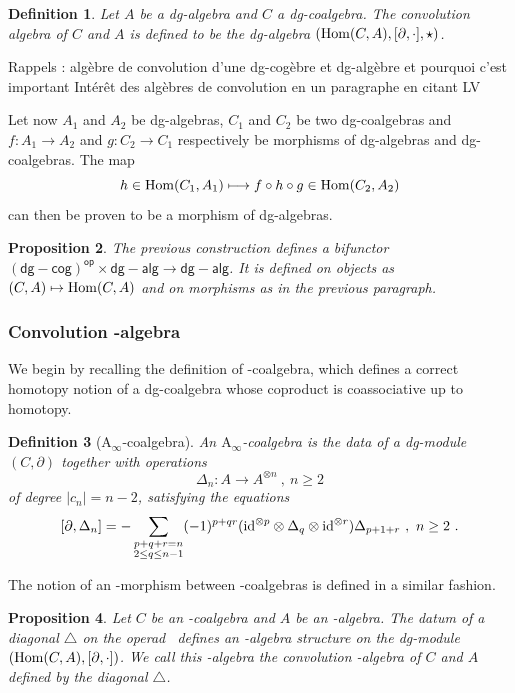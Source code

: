 \documentclass[twoside, 12pt]{amsart}
\newtheorem{definition}{Definition}[section]
\newtheorem{proposition}[definition]{Proposition}
\theoremstyle{remark}
\begin{document}
\begin{definition}
Let $A$ be a dg-algebra and $C$ a dg-coalgebra. The \emph{convolution algebra of $C$ and $A$} is defined to be the dg-algebra $(\mathrm{Hom} (C,A) , [ \partial , \cdot ] , \star)$.
\end{definition}

Rappels : algèbre de convolution d'une dg-cogèbre et dg-algèbre et pourquoi c'est important
Intérêt des algèbres de convolution en un paragraphe en citant LV

Let now $A_1$ and $A_2$ be dg-algebras, $C_1$ and $C_2$ be two dg-coalgebras and $f : A_1 \rightarrow A_2$ and $g : C_2 \rightarrow C_1$ respectively be morphisms of dg-algebras and dg-coalgebras.
The map
\[ h \in \mathrm{Hom} (C_1 , A_1) \longmapsto f \circ h \circ g \in \mathrm{Hom} (C_2,A_2) \]
can then be proven to be a morphism of dg-algebras.

\begin{proposition}
The previous construction defines a bifunctor $\mathsf{(dg-cog)^{op}} \times \mathsf{dg-alg} \rightarrow \mathsf{dg-alg}$. It is defined on objects as $(C,A) \mapsto \mathrm{Hom} (C,A)$ and on morphisms as in the previous paragraph.
\end{proposition}

\subsubsection{Convolution \Ainf -algebra}

We begin by recalling the definition of \Ainf -coalgebra, which defines a correct homotopy notion of a dg-coalgebra whose coproduct is coassociative up to homotopy.

\begin{definition}[$\mathrm{A}_\infty$-coalgebra] \label{def:ainf-alg} An \emph{$\mathrm{A}_\infty$-coalgebra} is the data of a dg-module $(C,\partial)$ together with operations \[ \Delta_n : A \to A^{\otimes n} \ , \ n \geq 2 \] of degree $|c_n|=n-2$, satisfying the equations 
\[ [ \partial , \Delta_n ] = - \sum_{\substack{p+q+r=n \\ 2 \leq q \leq n-1}} (-1)^{p+qr}(\mathrm{id}^{\otimes p} \otimes \Delta_q \otimes \mathrm{id}^{\otimes r})\Delta_{p+1+r} \ , \ n\geq 2 \ . \]
\end{definition}

The notion of an \Ainf -morphism between \Ainf -coalgebras is defined in a similar fashion.


\begin{proposition} \label{prop:convolution-ainf}
Let $C$ be an \Ainf -coalgebra and $A$ be an \Ainf -algebra. The datum of a diagonal $\triangle$ on the operad \Ainf\ defines an \Ainf -algebra structure on the dg-module $(\mathrm{Hom} (C,A) , [ \partial , \cdot ])$. We call this \Ainf -algebra the \emph{convolution \Ainf -algebra of $C$ and $A$} defined by the diagonal $\triangle$.
\end{proposition}
\end{document}
